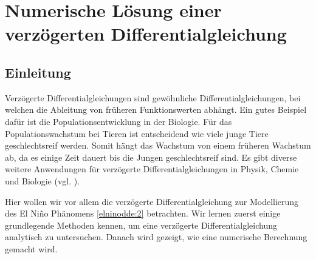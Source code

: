 %
%
%
\chapter{Numerische Lösung einer verzögerten Differentialgleichung\label{chapter:verzoegert}}
\begin{refsection}

\section{Einleitung}
Verzögerte Differentialgleichungen sind gewöhnliche Differentialgleichungen, bei welchen die Ableitung von früheren Funktionswerten abhängt.
Ein gutes Beispiel dafür ist die Populationsentwicklung in der Biologie. 
Für das Populationswachstum bei Tieren ist entscheidend wie viele junge Tiere geschlechtsreif werden.
Somit hängt das Wachstum von einem früheren Wachstum ab, da es einige Zeit dauert bis die Jungen geschlechtsreif sind.
Es gibt diverse weitere Anwendungen für verzögerte Differentialgleichungen in Physik, Chemie und Biologie (vgl. \cite{verzoegert:erneux}).

Hier wollen wir vor allem die verzögerte Differentialgleichung zur Modellierung des El Niño Phänomens \eqref{elninodde:2} betrachten.
Wir lernen zuerst einige grundlegende Methoden kennen, um eine verzögerte Differentialgleichung analytisch zu untersuchen. 
Danach wird gezeigt, wie eine numerische Berechnung gemacht wird.






\printbibliography[heading=subbibliography]
\end{refsection}
